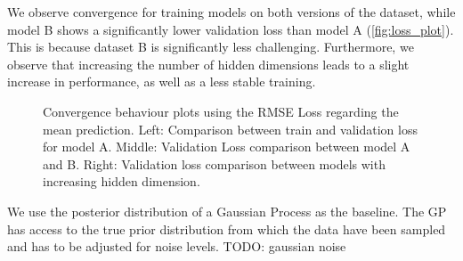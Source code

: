 We observe convergence for training models on both versions of the dataset, while model B shows a significantly lower validation loss than model A (\autoref{fig:loss_plot}). This is because dataset B is significantly less challenging. Furthermore, we observe that increasing the number of hidden dimensions leads to a slight increase in performance, as well as a less stable training.

\begin{figure*}
	\centering
	\resizebox{0.9\textwidth}{!}{
		
		
		
	}
	\caption{Convergence behaviour plots using the RMSE Loss regarding the mean prediction. Left: Comparison between train and validation loss for model A. Middle: Validation Loss comparison between model A and B. Right: Validation loss comparison between models with increasing hidden dimension.}
	\label{fig:loss_plot}
\end{figure*}

We use the posterior distribution of a Gaussian Process as the baseline. The GP has access to the true prior distribution from which the data have been sampled and has to be adjusted for noise levels. TODO: gaussian noise

